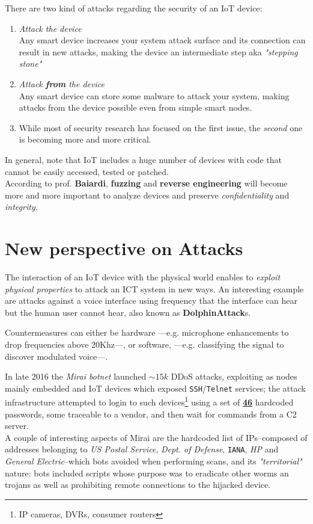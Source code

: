 There are two kind of attacks regarding the security of an IoT device:
\begin{enumerate}
   \item \textit{Attack the device}\\
   Any smart device increases your system attack surface and its connection
   can result in new attacks, making the device an intermediate step aka \textit{"stepping stone"}
   \item \textit{Attack \textbf{from} the device}\\
   Any smart device can store some malware to attack your system, making attacks
   from the device possible even from simple smart nodes.
   \nl

   \item[]While most of security research has focused on the first issue, the \textit{second}
   one is becoming more and more critical.
\end{enumerate}

In general, note that IoT includes a huge number of devices with code that cannot be
easily accessed, tested or patched.\\
According to prof. \textbf{Baiardi}, \textbf{fuzzing} and \textbf{reverse engineering} will become more and more important to
analyze devices and preserve \textit{confidentiality} and \textit{integrity}.

\section{New perspective on Attacks}

The interaction of an IoT device with the physical world enables to
\textit{exploit physical properties} to attack an ICT system in new ways.
An interesting example are attacks against a voice interface using frequency that the interface can hear but the human user cannot hear, also known as \textbf{DolphinAttack}s.


Countermeasures can either be hardware ---e.g. microphone enhancements to drop frequencies above 20Khz---, or software, ---e.g. classifying the signal to discover modulated voice---.

In late 2016 the \textit{Mirai botnet} launched $\sim 15k$ DDoS attacks, exploiting as nodes mainly embedded and IoT devices which exposed \texttt{SSH}/\texttt{Telnet} services;
the attack infrastructure attempted to login to such devices\footnote{IP cameras, DVRs, consumer routers} using a set of \underline{\textbf{46}} hardcoded passwords, some traceable to a vendor,
and then wait for commands from a C2 server.\\
A couple of interesting aspects of Mirai are the hardcoded list of IPs{--}composed of addresses belonging to \textit{US Postal Service}, \textit{Dept. of Defense}, \texttt{IANA}, \textit{HP} and \textit{General Electric}{--}which bots avoided when performing scans,
and its \textit{"territorial"} nature:
bots included scripts whose purpose was to eradicate other worms an trojans as well as prohibiting remote connections to the hijacked device.
\nl

